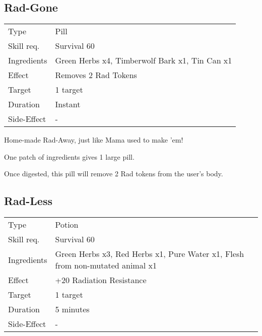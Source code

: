 \documentclass[11pt,a4paper,twocolumn]{book}
\begin{document}
\subsection*{Rad-Gone}
{
	\begin{tabu} to 75mm{| X[l,4] | X[l,8] |}
		\hline
		Type 			& Pill 														\\
		Skill req.	    & Survival 60 												\\
		Ingredients     & Green Herbs x4, Timberwolf Bark x1, Tin Can x1			\\
		Effect     		& Removes 2 Rad Tokens 										\\
		Target      	& 1 target													\\
		Duration  		& Instant 													\\
		Side-Effect     & -															\\ \hline
	\end{tabu}
	
}

\medskip

Home-made Rad-Away, just like Mama used to make 'em!

One patch of ingredients gives 1 large pill.

Once digested, this pill will remove 2 Rad tokens from the user's body.

\vfill

\subsection*{Rad-Less}
{
	\begin{tabu} to 75mm{| X[l,4] | X[l,8] |}
		\hline
		Type 			& Potion 													\\
		Skill req.	    & Survival 60 												\\
		Ingredients     & Green Herbs x3, Red Herbs x1, Pure Water x1, Flesh from non-mutated animal x1				\\
		Effect     		& +20 Radiation Resistance 								\\
		Target      	& 1 target													\\
		Duration  		& 5 minutes	 												\\
		Side-Effect     & -															\\ \hline
	\end{tabu}
	
}
\end{document}
